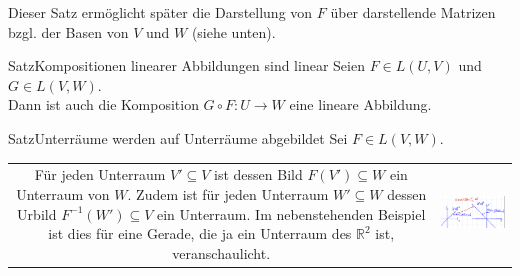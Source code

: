 Dieser Satz ermöglicht später die Darstellung von $F$ über darstellende Matrizen bzgl. der Basen von $V$ und $W$ (siehe unten).
\begin{Satz}
{Satz}{Kompositionen linearer Abbildungen sind linear}
Seien $F\in L(U,V)$ und $G\in L(V,W)$.\\
Dann ist auch die Komposition $G\circ F:U\to W$ eine lineare Abbildung.
\end{Satz}
\begin{Satz}
{Satz}{Unterräume werden auf Unterräume abgebildet}
Sei $F\in L(V,W)$.\\
\begin{tabular}{c l}
\parbox[b]{8cm}{
Für jeden Unterraum $V'\subseteq V$ ist dessen Bild $F(V')\subseteq W$ ein Unterraum von $W$.\\
Zudem ist für jeden Unterraum $W'\subseteq W$ dessen Urbild $F^{-1}(W')\subseteq V$ ein Unterraum.\\
Im nebenstehenden Beispiel ist dies für eine Gerade, die ja ein Unterraum des $\mathbb{R}^2$ ist, veranschaulicht.
} & \includegraphics[width=.45\textwidth]{Dateien/00/12BeispielUnterraumUnterraum.PNG}
\end{tabular}
\end{Satz}
